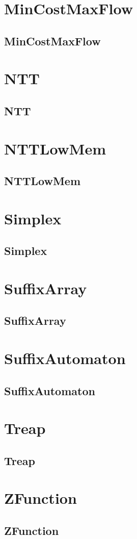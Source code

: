 \documentclass[a4paper, twocolumn]{article}
\begin{document}
\section{MinCostMaxFlow}
\subsection{MinCostMaxFlow}

\section{NTT}
\subsection{NTT}

\section{NTTLowMem}
\subsection{NTTLowMem}

\section{Simplex}
\subsection{Simplex}

\section{SuffixArray}
\subsection{SuffixArray}

\section{SuffixAutomaton}
\subsection{SuffixAutomaton}

\section{Treap}
\subsection{Treap}

\section{ZFunction}
\subsection{ZFunction}

\end{document}
